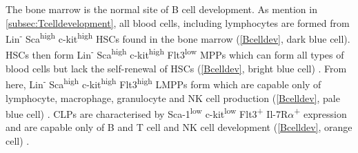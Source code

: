 
The bone marrow is the normal site of B cell development.
As mention in \cref{subsec:Tcelldevelopment}, all blood cells, including lymphocytes are formed from Lin\textsuperscript{-} Sca\textsuperscript{high} c-kit\textsuperscript{high} HSCs found in the bone marrow (\cref{Bcelldev}, dark blue cell).
HSCs then form Lin\textsuperscript{-} Sca\textsuperscript{high} c-kit\textsuperscript{high} Flt3\textsuperscript{low} MPPs which can form all types of blood cells but lack the self-renewal of HSCs (\cref{Bcelldev}, bright blue cell) \citep{Welinder2011}.
From here, Lin\textsuperscript{-} Sca\textsuperscript{high} c-kit\textsuperscript{high} Flt3\textsuperscript{high} LMPPs form which are capable only of lymphocyte, macrophage, granulocyte and NK cell production (\cref{Bcelldev}, pale blue cell) \citep{Adolfsson2005}.
CLPs are characterised by Sca-1\textsuperscript{low} c-kit\textsuperscript{low} Flt3\textsuperscript{+} Il-7R$\alpha$\textsuperscript{+} expression and are capable only of B and T cell and NK cell development (\cref{Bcelldev}, orange cell) \citep{Kondo1997}.


